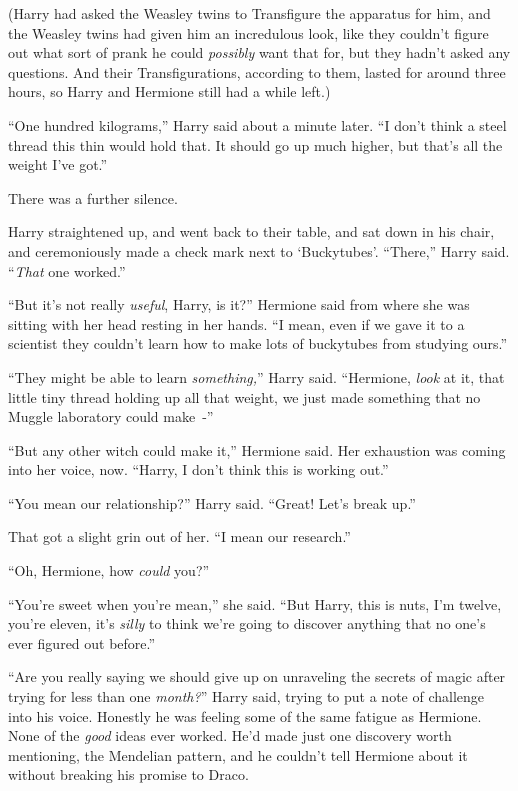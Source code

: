 (Harry had asked the Weasley twins to Transfigure the apparatus for him, and the Weasley twins had given him an incredulous look, like they couldn't figure out what sort of prank he could \emph{possibly} want that for, but they hadn't asked any questions. And their Transfigurations, according to them, lasted for around three hours, so Harry and Hermione still had a while left.)

``One hundred kilograms,'' Harry said about a minute later. ``I don't think a steel thread this thin would hold that. It should go up much higher, but that's all the weight I've got.''

There was a further silence.

Harry straightened up, and went back to their table, and sat down in his chair, and ceremoniously made a check mark next to `Buckytubes'. ``There,'' Harry said. ``\emph{That} one worked.''

``But it's not really \emph{useful}, Harry, is it?'' Hermione said from where she was sitting with her head resting in her hands. ``I mean, even if we gave it to a scientist they couldn't learn how to make lots of buckytubes from studying ours.''

``They might be able to learn \emph{something,}'' Harry said. ``Hermione, \emph{look} at it, that little tiny thread holding up all that weight, we just made something that no Muggle laboratory could make~-''

``But any other witch could make it,'' Hermione said. Her exhaustion was coming into her voice, now. ``Harry, I don't think this is working out.''

``You mean our relationship?'' Harry said. ``Great! Let's break up.''

That got a slight grin out of her. ``I mean our research.''

``Oh, Hermione, how \emph{could} you?''

``You're sweet when you're mean,'' she said. ``But Harry, this is nuts, I'm twelve, you're eleven, it's \emph{silly} to think we're going to discover anything that no one's ever figured out before.''

``Are you really saying we should give up on unraveling the secrets of magic after trying for less than one \emph{month?}'' Harry said, trying to put a note of challenge into his voice. Honestly he was feeling some of the same fatigue as Hermione. None of the \emph{good} ideas ever worked. He'd made just one discovery worth mentioning, the Mendelian pattern, and he couldn't tell Hermione about it without breaking his promise to Draco.


